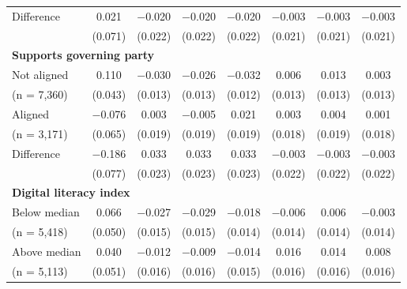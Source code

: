 \begin{tabular}[t]{lccccccc}
\hspace{1em} Difference & \num{0.021} & \num{-0.020} & \num{-0.020} & \num{-0.020} & \num{-0.003} & \num{-0.003} & \num{-0.003}\\
\hspace{2em} & (\num{0.071}) & (\num{0.022}) & (\num{0.022}) & (\num{0.022}) & (\num{0.021}) & (\num{0.021}) & (\num{0.021})\\\multicolumn{4}{l}{\textbf{Supports governing party}} \rule{0pt}{1.2\normalbaselineskip}\\
\hspace{1em} Not aligned & \num{0.110} & \num{-0.030} & \num{-0.026} & \num{-0.032} & \num{0.006} & \num{0.013} & \num{0.003}\\
\hspace{2em}(n = 7,360) & (\num{0.043}) & (\num{0.013}) & (\num{0.013}) & (\num{0.012}) & (\num{0.013}) & (\num{0.013}) & (\num{0.013})\\
\hspace{1em} Aligned & \num{-0.076} & \num{0.003} & \num{-0.005} & \num{0.021} & \num{0.003} & \num{0.004} & \num{0.001}\\
\hspace{2em}(n = 3,171) & (\num{0.065}) & (\num{0.019}) & (\num{0.019}) & (\num{0.019}) & (\num{0.018}) & (\num{0.019}) & (\num{0.018})\\\cmidrule(lr){2-8}
\hspace{1em} Difference & \num{-0.186} & \num{0.033} & \num{0.033} & \num{0.033} & \num{-0.003} & \num{-0.003} & \num{-0.003}\\
\hspace{2em} & (\num{0.077}) & (\num{0.023}) & (\num{0.023}) & (\num{0.023}) & (\num{0.022}) & (\num{0.022}) & (\num{0.022})\\\multicolumn{4}{l}{\textbf{Digital literacy index}} \rule{0pt}{1.2\normalbaselineskip}\\
\hspace{1em} Below median & \num{0.066} & \num{-0.027} & \num{-0.029} & \num{-0.018} & \num{-0.006} & \num{0.006} & \num{-0.003}\\
\hspace{2em}(n = 5,418) & (\num{0.050}) & (\num{0.015}) & (\num{0.015}) & (\num{0.014}) & (\num{0.014}) & (\num{0.014}) & (\num{0.014})\\
\hspace{1em} Above median & \num{0.040} & \num{-0.012} & \num{-0.009} & \num{-0.014} & \num{0.016} & \num{0.014} & \num{0.008}\\
\hspace{2em}(n = 5,113) & (\num{0.051}) & (\num{0.016}) & (\num{0.016}) & (\num{0.015}) & (\num{0.016}) & (\num{0.016}) & (\num{0.016})\\\cmidrule(lr){2-8}

\end{tabular}
